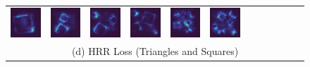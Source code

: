 \documentclass[letterpaper]{article} %
\begin{document}
\begin{figure}[!htbp]
\begin{tabular}{cccccccccccc}
\multicolumn{1}{c}{\includegraphics[width=0.125\columnwidth]{saliency/hrr/circle/square_1.png}} \hspace{-12pt} &  \multicolumn{1}{c}{\includegraphics[width=0.125\columnwidth]{saliency/hrr/circle/square_2.png}} \hspace{-12pt} & \multicolumn{1}{c}{\includegraphics[width=0.125\columnwidth]{saliency/hrr/circle/square_3.png}} \hspace{-12pt} & \multicolumn{1}{c}{\includegraphics[width=0.125\columnwidth]{saliency/hrr/circle/square_4.png}} \hspace{-12pt} & \multicolumn{1}{c}{\includegraphics[width=0.125\columnwidth]{saliency/hrr/circle/square_5.png}} \hspace{-12pt} & \multicolumn{1}{c}{\includegraphics[width=0.125\columnwidth]{saliency/hrr/circle/square_6.png}} \\
\multicolumn{12}{c}{(d) HRR Loss (Triangles and Squares)} \\


\end{tabular}
\end{figure}
\end{document}
